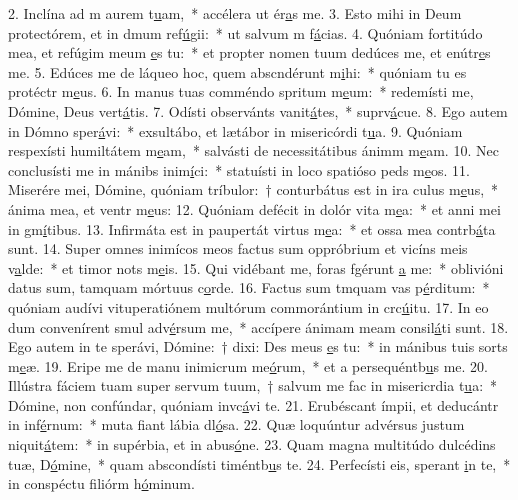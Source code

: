 2. Inclína ad m aurem t\uline{u}am,~* accélera ut ér\uline{a}s me.
3. Esto mihi in Deum protectórem, et in dmum ref\uline{ú}gii:~* ut salvum m f\uline{á}cias.
4. Quóniam fortitúdo mea, et refúgim meum \uline{e}s tu:~* et propter nomen tuum dedúces me, et enútr\uline{e}s me.
5. Edúces me de láqueo hoc, quem abscndérunt m\uline{i}hi:~* quóniam tu es protéctr m\uline{e}us.
6. In manus tuas comméndo spritum m\uline{e}um:~* redemísti me, Dómine, Deus vert\uline{á}tis.
7. Odísti observánts vanit\uline{á}tes,~* suprv\uline{á}cue.
8. Ego autem in Dómno sper\uline{á}vi:~* exsultábo, et lætábor in misericórdi t\uline{u}a.
9. Quóniam respexísti humiltátem m\uline{e}am,~* salvásti de necessitátibus ánimm m\uline{e}am.
10. Nec conclusísti me in mánibs inim\uline{í}ci:~* statuísti in loco spatióso peds m\uline{e}os.
11. Miserére mei, Dómine, quóniam tríbulor:~† conturbátus est in ira culus m\uline{e}us,~* ánima mea, et ventr m\uline{e}us:
12. Quóniam defécit in dolór vita m\uline{e}a:~* et anni mei in gm\uline{í}tibus.
13. Infirmáta est in paupertát virtus m\uline{e}a:~* et ossa mea contrb\uline{á}ta sunt.
14. Super omnes inimícos meos factus sum oppróbrium et vicíns meis v\uline{a}lde:~* et timor nots m\uline{e}is.
15. Qui vidébant me, foras fgérunt \uline{a} me:~* oblivióni datus sum, tamquam mórtuus  c\uline{o}rde.
16. Factus sum tmquam vas p\uline{é}rditum:~* quóniam audívi vituperatiónem multórum commorántium in crc\uline{ú}itu.
17. In eo dum convenírent smul adv\uline{é}rsum me,~* accípere ánimam meam consil\uline{á}ti sunt.
18. Ego autem in te sperávi, Dómine:~† dixi: Des meus \uline{e}s tu:~* in mánibus tuis sorts m\uline{e}æ.
19. Eripe me de manu inimicrum me\uline{ó}rum,~* et a persequéntb\uline{u}s me.
20. Illústra fáciem tuam super servum tuum,~† salvum me fac in misericrdia t\uline{u}a:~* Dómine, non confúndar, quóniam invc\uline{á}vi te.
21. Erubéscant ímpii, et deducántr in inf\uline{é}rnum:~* muta fiant lábia dl\uline{ó}sa.
22. Quæ loquúntur advérsus justum niquit\uline{á}tem:~* in supérbia, et in abus\uline{ó}ne.
23. Quam magna multitúdo dulcédins tuæ, D\uline{ó}mine,~* quam abscondísti timéntb\uline{u}s te.
24. Perfecísti eis,  sperant \uline{i}n te,~* in conspéctu filiórm h\uline{ó}minum.

